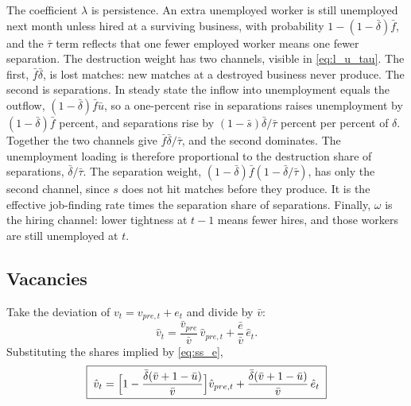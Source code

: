 \documentclass[authoryear, review, 12pt]{elsarticle}
\begin{document}
The coefficient $\lambda$ is persistence. An extra unemployed worker is still unemployed
next month unless hired at a surviving business, with probability $1-(1-\bar\delta)\bar f$,
and the $\bar\tau$ term reflects that one fewer employed worker means one fewer separation.
The destruction weight has two channels, visible in \eqref{eq:l_u_tau}. The first, $\bar
f\bar\delta$, is lost matches: new matches at a destroyed business never produce. The
second is separations. In steady state the inflow into unemployment equals the outflow,
$(1-\bar\delta)\bar f\bar u$, so a one-percent rise in separations raises unemployment by
$(1-\bar\delta)\bar f$ percent, and separations rise by $(1-\bar s)\bar\delta/\bar\tau$ percent per
percent of $\delta$. Together the two channels give $\bar f\bar\delta/\bar\tau$, and the
second dominates. The unemployment loading is therefore proportional to the destruction
share of separations, $\bar\delta/\bar\tau$. The separation weight,
$(1-\bar\delta)\bar f(1-\bar\delta/\bar\tau)$, has only the second channel, since $s$ does not
hit matches before they produce. It is the effective job-finding rate times the separation
share of separations. Finally, $\omega$ is the hiring channel: lower tightness at $t-1$
means fewer hires, and those workers are still unemployed at $t$.

\subsection{Vacancies}

Take the deviation of $v_t=v_{pre,t}+e_t$ and divide by $\bar v$:
\[
	\hat v_t=\frac{\bar v_{pre}}{\bar v}\,\hat v_{pre,t}+\frac{\bar e}{\bar v}\,\hat e_t .
\]
Substituting the shares implied by \eqref{eq:ss_e},
\begin{equation}\label{eq:l_v}
	\boxed{\;
	\hat v_t=\Bigl[1-\frac{\bar\delta(\bar v+1-\bar u)}{\bar v}\Bigr]\hat v_{pre,t}
	+\frac{\bar\delta(\bar v+1-\bar u)}{\bar v}\,\hat e_t\;}
\end{equation}
\end{document}
